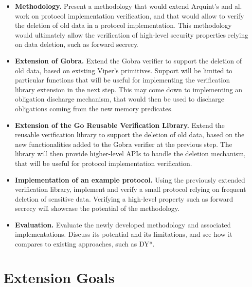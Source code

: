 \documentclass{article}
\begin{document}
\begin{itemize}
      \item \textbf{Methodology.} Present a methodology that would extend Arquint's and al. work on protocol implementation verification, and that would allow to verify the deletion of old data in a protocol implementation. This methodology would ultimately allow the verification of high-level security properties relying on data deletion, such as forward secrecy.
      \item \textbf{Extension of Gobra.} Extend the Gobra verifier to support the deletion of old data, based on existing Viper's primitives. Support will be limited to particular functions that will be useful for implementing the verification library extension in the next step. This may come down to implementing an obligation discharge mechanism, that would then be used to discharge obligations coming from the new memory predicates.
      \item \textbf{Extension of the Go Reusable Verification Library.} Extend the reusable verification library to support the deletion of old data, based on the new functionalities added to the Gobra verifier at the previous step. The library will then provide higher-level APIs to handle the deletion mechanism, that will be useful for protocol implementation verification.
      \item \textbf{Implementation of an example protocol.} Using the previously extended verification library, implement and verify a small protocol relying on frequent deletion of sensitive data. Verifying a high-level property such as forward secrecy will showcase the potential of the methodology.
      \item \textbf{Evaluation.} Evaluate the newly developed methodology and associated implementations. Discuss its potential and its limitations, and see how it compares to existing approaches, such as DY*.
\end{itemize}

\section{Extension Goals}
\end{document}
